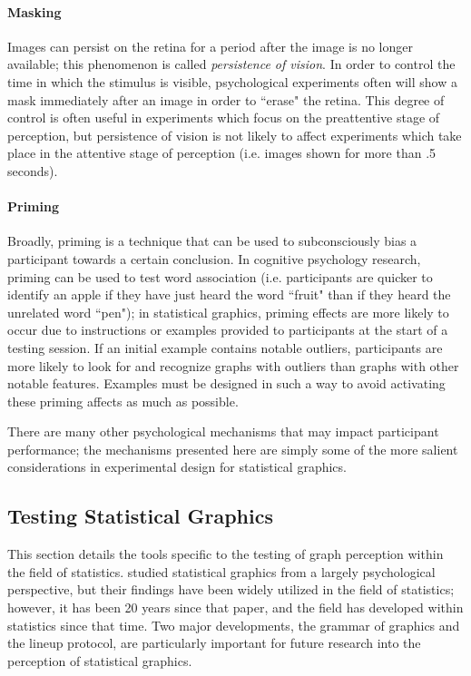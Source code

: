 \documentclass[11pt]{isuthesis}\usepackage[]{graphicx}\usepackage[]{color}
\begin{document}
\paragraph{Masking} Images can persist on the retina for a period after the image is no longer available; this phenomenon is called \emph{persistence of vision}. In order to control the time in which the stimulus is visible, psychological experiments often will show a mask immediately after an image in order to ``erase" the retina. This degree of control is often useful in experiments which focus on the preattentive stage of perception, but persistence of vision is not likely to affect experiments which take place in the attentive stage of perception (i.e. images shown for more than .5 seconds).

\paragraph{Priming} Broadly, priming is a technique that can be used to subconsciously bias a participant towards a certain conclusion. In cognitive psychology research, priming can be used to test word association (i.e. participants are quicker to identify an apple if they have just heard the word ``fruit" than if they heard the unrelated word ``pen"); in statistical graphics, priming effects are more likely to occur due to instructions or examples provided to participants at the start of a testing session. If an initial example contains notable outliers, participants are more likely to look for and recognize graphs with outliers than graphs with other notable features. Examples must be designed in such a way to avoid activating these priming affects as much as possible. 

There are many other psychological mechanisms that may impact participant performance; the mechanisms presented here are simply some of the more salient considerations in experimental design for statistical graphics. 

\subsection{Testing Statistical Graphics}
This section details the tools specific to the testing of graph perception within the field of statistics. \citet{cleveland:1985} studied statistical graphics from a largely psychological perspective, but their findings have been widely utilized in the field of statistics; however, it has been 20 years since that paper, and the field has developed within statistics since that time. Two major developments, the grammar of graphics and the lineup protocol, are particularly important for future research into the perception of statistical graphics. 
\end{document}
